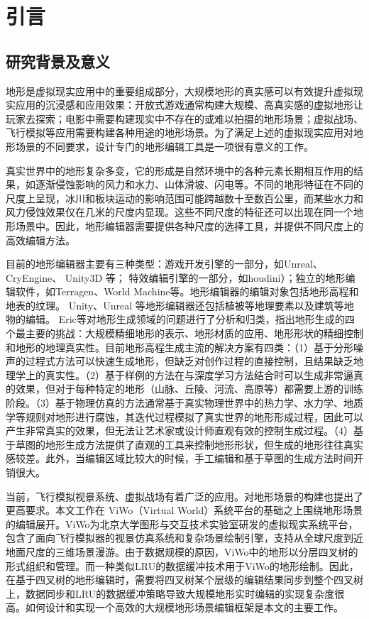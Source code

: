 
\chapter{引言}
\section{研究背景及意义}
地形是虚拟现实应用中的重要组成部分，大规模地形的真实感可以有效提升虚拟现实应用的沉浸感和应用效果：开放式游戏通常构建大规模、高真实感的虚拟地形让玩家去探索；电影中需要构建现实中不存在的或难以拍摄的地形场景；虚拟战场、飞行模拟等应用需要构建各种用途的地形场景。为了满足上述的虚拟现实应用对地形场景的不同要求，设计专门的地形编辑工具是一项很有意义的工作。\par
真实世界中的地形复杂多变，它的形成是自然环境中的各种元素长期相互作用的结果，如逐渐侵蚀影响的风力和水力、山体滑坡、闪电等。不同的地形特征在不同的尺度上呈现，冰川和板块运动的影响范围可能跨越数十至数百公里，而某些水力和风力侵蚀效果仅在几米的尺度内显现。这些不同尺度的特征还可以出现在同一个地形场景中。因此，地形编辑器需要提供各种尺度的选择工具，并提供不同尺度上的高效编辑方法。\par
目前的地形编辑器主要有三种类型：游戏开发引擎的一部分，如Unreal\supercite{unreal}、CryEngine\supercite{cry-engine}、 Unity3D \supercite{unity}等； 特效编辑引擎的一部分，如houdini\supercite{houdini}）；独立的地形编辑软件，如Terragen\supercite{terragen}、World Machine\supercite{world-machine}等。地形编辑器的编辑对象包括地形高程和地表的纹理。 Unity、Unreal 等地形编辑器还包括植被等地理要素以及建筑等地物的编辑。 Eric等\supercite{eric-review}对地形生成领域的问题进行了分析和归类，指出地形生成的四个最主要的挑战：大规模精细地形的表示、地形材质的应用、地形形状的精细控制和地形的地理真实性。目前地形高程生成主流的解决方案有四类：（1）基于分形噪声的过程式方法\supercite{Belhadj2007Terrain}可以快速生成地形，但缺乏对创作过程的直接控制，且结果缺乏地理学上的真实性。（2）基于样例的方法\supercite{TasseEnhanced}在与深度学习方法结合时可以生成非常逼真的效果，但对于每种特定的地形（山脉、丘陵、河流、高原等）都需要上游的训练阶段。（3）基于物理仿真的方法\supercite{Mei2007Fast}通常基于真实物理世界中的热力学、水力学、地质学等规则对地形进行腐蚀，其迭代过程模拟了真实世界的地形形成过程，因此可以产生非常真实的效果，但无法让艺术家或设计师直观有效的控制生成过程。（4）基于草图的地形生成方法\supercite{Zhou2007Terrain}提供了直观的工具来控制地形形状，但生成的地形往往真实感较差。此外，当编辑区域比较大的时候，手工编辑和基于草图的生成方法时间开销很大。\par
当前，飞行模拟视景系统、虚拟战场有着广泛的应用。对地形场景的构建也提出了更高要求。本文工作在 ViWo（Virtual World）系统平台的基础之上围绕地形场景的编辑展开。ViWo为北京大学图形与交互技术实验室研发的虚拟现实系统平台，包含了面向飞行模拟器的视景仿真系统和复杂场景绘制引擎，支持从全球尺度到近地面尺度的三维场景漫游。由于数据规模的原因，ViWo中的地形以分层四叉树的形式组织和管理。而一种类似LRU的数据缓冲技术用于ViWo的地形绘制。因此，在基于四叉树的地形编辑时，需要将四叉树某个层级的编辑结果同步到整个四叉树上，数据同步和LRU的数据缓冲策略导致大规模地形实时编辑的实现复杂度很高。如何设计和实现一个高效的大规模地形场景编辑框架是本文的主要工作。
